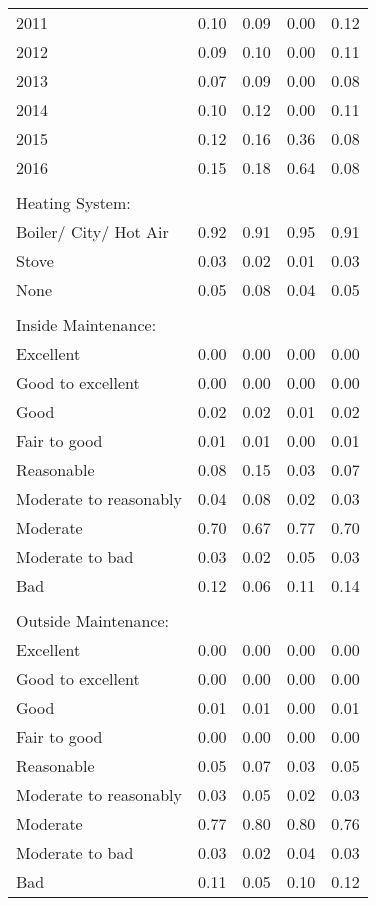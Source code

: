 \documentclass[12pt]{article}
\begin{document}
\begin{table}[H]
\begin{tabular}{lcccc}
    2011  & 0.10  & 0.09  & 0.00  & 0.12 \\
    2012  & 0.09  & 0.10  & 0.00  & 0.11 \\
    2013  & 0.07  & 0.09  & 0.00  & 0.08 \\
    2014  & 0.10  & 0.12  & 0.00  & 0.11 \\
    2015  & 0.12  & 0.16  & 0.36  & 0.08 \\
    2016  & 0.15  & 0.18  & 0.64  & 0.08 \\
          &       &       &       &  \\
    Heating System: &       &       &       &  \\
    Boiler/ City/ Hot Air & 0.92  & 0.91  & 0.95  & 0.91 \\
    Stove & 0.03  & 0.02  & 0.01  & 0.03 \\
    None  & 0.05  & 0.08  & 0.04  & 0.05 \\
          &       &       &       &  \\
    Inside Maintenance: &       &       &       &  \\
    Excellent & 0.00  & 0.00  & 0.00  & 0.00 \\
    Good to excellent & 0.00  & 0.00  & 0.00  & 0.00 \\
    Good  & 0.02  & 0.02  & 0.01  & 0.02 \\
    Fair to good & 0.01  & 0.01  & 0.00  & 0.01 \\
    Reasonable & 0.08  & 0.15  & 0.03  & 0.07 \\
    Moderate to reasonably & 0.04  & 0.08  & 0.02  & 0.03 \\
    Moderate & 0.70  & 0.67  & 0.77  & 0.70 \\
    Moderate to bad & 0.03  & 0.02  & 0.05  & 0.03 \\
    Bad   & 0.12  & 0.06  & 0.11  & 0.14 \\
          &       &       &       &  \\
    Outside Maintenance: &       &       &       &  \\
    Excellent & 0.00  & 0.00  & 0.00  & 0.00 \\
    Good to excellent & 0.00  & 0.00  & 0.00  & 0.00 \\
    Good  & 0.01  & 0.01  & 0.00  & 0.01 \\
    Fair to good & 0.00  & 0.00  & 0.00  & 0.00 \\
    Reasonable & 0.05  & 0.07  & 0.03  & 0.05 \\
    Moderate to reasonably & 0.03  & 0.05  & 0.02  & 0.03 \\
    Moderate & 0.77  & 0.80  & 0.80  & 0.76 \\
    Moderate to bad & 0.03  & 0.02  & 0.04  & 0.03 \\
    Bad   & 0.11  & 0.05  & 0.10  & 0.12 \\
 \hline

    \end{tabular}%


  \label{tab:addlabel}%
\end{table}%
\end{document}
